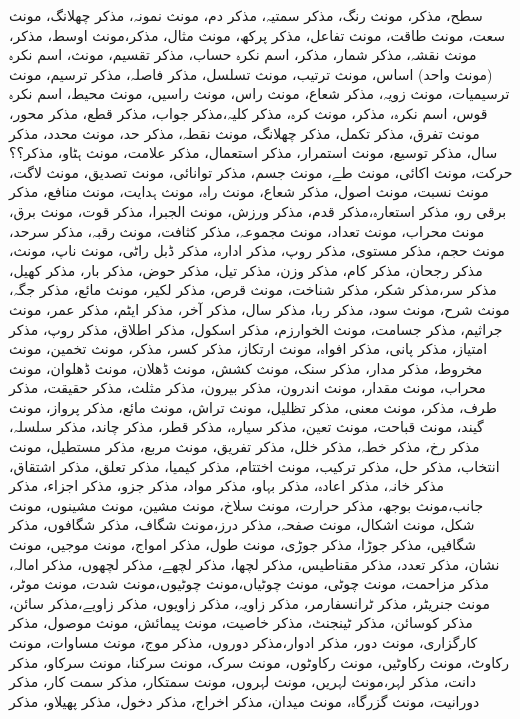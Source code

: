 سطح، مذکر، مونث
رنگ، مذکر
سمتیہ، مذکر
دم، مونث
نمونہ، مذکر
چھلانگ، مونث
سعت، مونث
طاقت، مونث
تفاعل، مذکر
پرکھ، مونث
مثال، مذکر،مونث
اوسط، مذکر، مونث
نقشہ، مذکر
شمار، مذکر، اسم نکرہ
حساب، مذکر
تقسیم، مونث، اسم نکرہ (مونث واحد)
اساس، مونث
ترتیب، مونث
تسلسل، مذکر
فاصلہ، مذکر
ترسیم، مونث
ترسیمیات، مونث
زویہ، مذکر
شعاع، مونث
راس، مونث
راسیں، مونث
محیط، اسم نکرہ
قوس، اسم نکرہ، مذکر، مونث
کرہ، مذکر
کلیہ،مذکر
جواب، مذکر
قطع، مذکر
محور، مونث
تفرق، مذکر
تکمل، مذکر
چھلانگ، مونث
نقطہ، مذکر
حد، مونث
محدد، مذکر
سال، مذکر
توسیع، مونث
استمرار، مذکر
استعمال، مذکر
علامت، مونث
ہٹاو، مذکر؟؟
حرکت، مونث
اکائی، مونث
طے، مونث
جسم، مذکر
توانائی، مونث
تصدیق، مونث
لاگت، مونث
نسبت، مونث
اصول، مذکر
شعاع، مونث
راہ، مونث
ہدایت، مونث
منافع، مذکر
برقی رو، مذکر
استعارہ،مذکر
قدم، مذکر
ورزش، مونث
الجبرا، مذکر
قوت، مونث
برق، مونث
محراب، مونث
تعداد، مونث
مجموعہ، مذکر
کثافت، مونث
رقبہ، مذکر
سرحد، مونث
حجم، مذکر
مستوی، مذکر
روپ، مذکر
ادارہ، مذکر
ڈبل راٹی، مونث
ناپ، مونث، مذکر
رجحان، مذکر
کام، مذکر
وزن، مذکر
تیل، مذکر
حوض، مذکر
بار، مذکر
کھیل، مذکر
سر،مذکر
شکر، مذکر
شناخت، مونث
 قرص، مذکر
لکیر، مونث
مائع، مذکر
جگہ، مونث
شرح، مونث
سود، مذکر
ربا، مذکر
سال، مذکر
آخر، مذکر
ایٹم، مذکر
عمر، مونث
جراثیم، مذکر
جسامت، مونث
الخوارزم، مذکر
اسکول، مذکر
اطلاق، مذکر
روپ، مذکر
امتیاز، مذکر
پانی، مذکر
افواہ، مونث
ارتکاز، مذکر
کسر، مذکر، مونث
تخمین، مونث
مخروط، مذکر
مدار، مذکر
سنک، مونث
کشش، مونث
ڈھلان، مونث
ڈھلوان، مونث
محراب، مونث
مقدار، مونث
اندرون، مذکر
بیرون، مذکر
مثلث، مذکر
حقیقت، مذکر
طرف، مذکر، مونث
معنی، مذکر
تظلیل، مونث
تراش، مونث
مائع، مذکر
پرواز، مونث
گیند، مونث
قباحت، مونث
تعین، مذکر
سیارہ، مذکر
قطر، مذکر
چاند، مذکر
سلسلہ، مذکر
رخ، مذکر
خطہ، مذکر
خلل، مذکر
تفریق، مونث
مربع، مذکر
مستطیل، مونث
انتخاب، مذکر
حل، مذکر
ترکیب، مونث
اختتام، مذکر
کیمیا، مذکر
تعلق، مذکر
اشتقاق، مذکر
خانہ، مذکر
اعادہ، مذکر
بہاو، مذکر
مواد، مذکر
جزو، مذکر
اجزاء، مذکر
جانب،مونث
بوجھ، مذکر
حرارت، مونث
سلاخ، مونث
مشین، مونث
مشینوں، مونث
شکل، مونث
اشکال، مونث
صفحہ، مذکر
درز،مونث
شگاف، مذکر
شگافوں، مذکر
شگافیں، مذکر
جوڑا، مذکر
جوڑی، مونث
طول، مذکر
امواج، مونث
موجیں، مونث
نشان، مذکر
تعدد، مذکر
مقناطیس، مذکر
لچھا، مذکر
لچھے، مذکر
لچھوں، مذکر
امالہ، مذکر
مزاحمت، مونث
چوٹی، مونث
چوٹیاں،مونث
چوٹیوں،مونث
شدت، مونث
موٹر، مونث
جنریٹر، مذکر
ٹرانسفارمر، مذکر
زاویہ، مذکر
زاویوں، مذکر
زاویے،مذکر
سائن، مذکر
کوسائن، مذکر
ٹینجنٹ، مذکر
خاصیت، مونث
پیمائش، مونث
موصول، مذکر
کارگزاری، مونث
دور، مذکر
ادوار،مذکر
دوروں، مذکر
موج، مونث
مساوات، مونث
رکاوٹ، مونث
رکاوٹیں، مونث
رکاوٹوں، مونث
سرک، مونث
سرکنا، مونث
سرکاو، مذکر
دانت، مذکر
لہر،مونث
لہریں، مونث
لہروں، مونث
سمتکار، مذکر
سمت کار، مذکر
دورانیت، مونث
گزرگاہ، مونث
میدان، مذکر
اخراج، مذکر
دخول، مذکر
پھیلاو، مذکر

